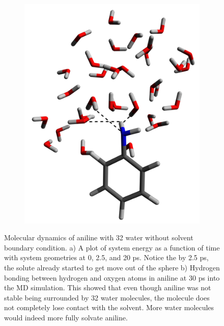 \documentclass[
journal=jpcbfk, %
manuscript=article]{achemso}
\begin{document}
		\begin{figure}[!tbp]
			\centering
			\begin{subfigure}[b]{0.58\textwidth}
				\caption{}
				\label{fig:aniline32a)}
			\end{subfigure}
			\hfill
			\begin{subfigure}[b]{0.40\textwidth}
				\includegraphics[width=1\textwidth]{images/aniline32_2500_hBond.png}
				\caption{}
				\label{fig:aniline32b)}
			\end{subfigure}
			\caption{Molecular dynamics of aniline with 32 water without solvent boundary condition. a) A plot of system energy as a function of time with system geometries at 0, 2.5, and 20 ps. Notice the by 2.5 ps, the solute already started to get move out of the sphere b) Hydrogen bonding between hydrogen and oxygen atoms in aniline at 30 ps into the MD simulation. This showed that even though aniline was not stable being surrounded by 32 water molecules, the molecule does not completely lose contact with the solvent. More water molecules would indeed more fully solvate aniline.}
		\end{figure}
\end{document}
